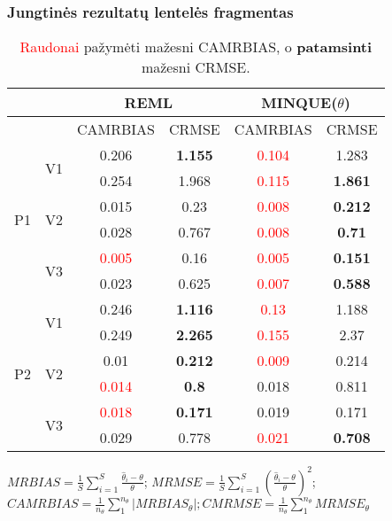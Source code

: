 \documentclass[utf8,hyperref={unicode,pdftex}]{beamer}
\begin{document}
\begin{frame}
\frametitle{Jungtinės rezultatų lentelės fragmentas}

\begin{table}
\centering
{\scriptsize 
\begin{tabular}{cc|cc|cc|}
   & & \multicolumn{2}{c|}{REML}&\multicolumn{2}{c|}{MINQUE($\theta$)}\\ \hline
 &  & CAMRBIAS & CRMSE & CAMRBIAS & CRMSE \\ 
  \hline
\multirow{6}{*}{P1} & \multirow{2}{*}{V1} & 0.206 & \textbf{1.155} &  \textcolor{red}{0.104} & 1.283 \\ 
   &  & 0.254 & 1.968 & \textcolor{red}{0.115} & \textbf{1.861} \\ 
   & \multirow{2}{*}{V2} & 0.015 & 0.23 & \textcolor{red}{0.008} & \textbf{0.212} \\ 
   &  & 0.028 & 0.767  & \textcolor{red}{0.008} & \textbf{0.71} \\ 
   & \multirow{2}{*}{V3} & \textcolor{red}{0.005} & 0.16  & \textcolor{red}{0.005} & \textbf{0.151} \\ 
   &  & 0.023 & 0.625 & \textcolor{red}{0.007} & \textbf{0.588} \\ 
   \hline \hline
\multirow{6}{*}{P2} & \multirow{2}{*}{V1} & 0.246 & \textbf{1.116}  & \textcolor{red}{0.13} & 1.188 \\ 
   &  & 0.249 & \textbf{2.265} & \textcolor{red}{0.155} & 2.37 \\ 
   & \multirow{2}{*}{V2} & 0.01 & \textbf{0.212} & \textcolor{red}{0.009} & 0.214 \\ 
   &  & \textcolor{red}{0.014} & \textbf{0.8} & 0.018 & 0.811 \\ 
   & \multirow{2}{*}{V3} & \textcolor{red}{0.018} & \textbf{0.171} & 0.019 & 0.171 \\ 
   &  & 0.029 & 0.778 & \textcolor{red}{0.021} & \textbf{0.708} \\ 
\hline
\end{tabular}
}
\caption{ \textcolor{red}{Raudonai} pažymėti mažesni CAMRBIAS, o \textbf{patamsinti} mažesni CRMSE. }
\end{table}

\centering
{
$MRBIAS=\frac{1}{S}\sum_{i=1}^S\frac{\hat{\theta}_i-\theta}{\theta}$;
$MRMSE=\frac{1}{S}\sum_{i=1}^S\left(\frac{\hat{\theta}_{i}-\theta}{\theta}\right)^2$;\\
$CAMRBIAS=\frac{1}{n_{\theta}}\sum_1^{n_{\theta}}|MRBIAS_{\theta}|;CMRMSE=\frac{1}{n_{\theta}}\sum_1^{n_{\theta}}MRMSE_{\theta }$

}



\end{frame}
\end{document}
